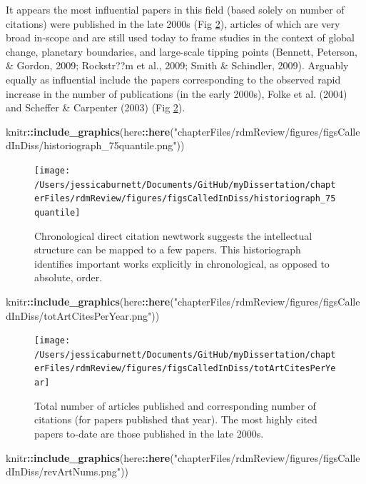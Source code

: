 \documentclass[12pt,twoside,openany]{reedthesis}
\newenvironment{Shaded}{\begin{snugshade}}{\end{snugshade}}
\newcommand{\KeywordTok}[1]{\textcolor[rgb]{0.13,0.29,0.53}{\textbf{#1}}}
\newcommand{\NormalTok}[1]{#1}
\newcommand{\OperatorTok}[1]{\textcolor[rgb]{0.81,0.36,0.00}{\textbf{#1}}}
\newcommand{\StringTok}[1]{\textcolor[rgb]{0.31,0.60,0.02}{#1}}
\begin{document}
It appears the most influential papers in this field (based solely on number of citations) were published in the late 2000s (Fig \ref{fig:totArtCitesPerYear}), articles of which are very broad in-scope and are still used today to frame studies in the context of global change, planetary boundaries, and large-scale tipping points (Bennett, Peterson, \& Gordon, 2009; Rockstr??m et al., 2009; Smith \& Schindler, 2009). Arguably equally as influential include the papers corresponding to the observed rapid increase in the number of publications (in the early 2000s), Folke et al. (2004) and Scheffer \& Carpenter (2003) (Fig \ref{fig:totArtCitesPerYear}).
\begin{Shaded}
\begin{Highlighting}[]
\NormalTok{knitr}\OperatorTok{::}\KeywordTok{include_graphics}\NormalTok{(here}\OperatorTok{::}\KeywordTok{here}\NormalTok{(}\StringTok{"chapterFiles/rdmReview/figures/figsCalledInDiss/historiograph_75quantile.png"}\NormalTok{))}
\end{Highlighting}
\end{Shaded}
\begin{figure}
\texttt{[image: /Users/jessicaburnett/Documents/GitHub/myDissertation/chapterFiles/rdmReview/figures/figsCalledInDiss/historiograph\_75quantile]} \caption{Chronological direct citation newtwork suggests the intellectual structure can be mapped to a few papers. This historiograph identifies important works explicitly in chronological, as opposed to absolute, order.}\label{fig:historiograph}
\end{figure}
\begin{Shaded}
\begin{Highlighting}[]
\NormalTok{knitr}\OperatorTok{::}\KeywordTok{include_graphics}\NormalTok{(here}\OperatorTok{::}\KeywordTok{here}\NormalTok{(}\StringTok{"chapterFiles/rdmReview/figures/figsCalledInDiss/totArtCitesPerYear.png"}\NormalTok{))}
\end{Highlighting}
\end{Shaded}
\begin{figure}
\texttt{[image: /Users/jessicaburnett/Documents/GitHub/myDissertation/chapterFiles/rdmReview/figures/figsCalledInDiss/totArtCitesPerYear]} \caption{Total number of articles published and corresponding number of citations (for papers published that year). The most highly cited papers to-date are those published in the late 2000s.}\label{fig:totArtCitesPerYear}
\end{figure}
\begin{Shaded}
\begin{Highlighting}[]
\NormalTok{knitr}\OperatorTok{::}\KeywordTok{include_graphics}\NormalTok{(here}\OperatorTok{::}\KeywordTok{here}\NormalTok{(}\StringTok{"chapterFiles/rdmReview/figures/figsCalledInDiss/revArtNums.png"}\NormalTok{))}
\end{Highlighting}
\end{Shaded}
\end{document}
